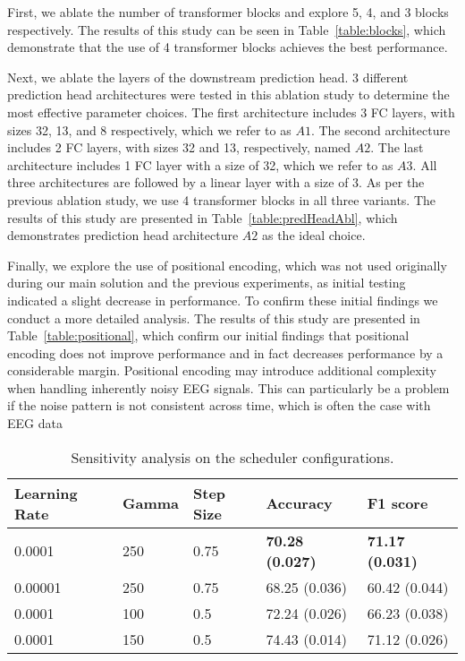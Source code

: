 \documentclass[sigconf]{acmart}
\begin{document}
First, we ablate the number of transformer blocks and explore 5, 4, and 3 blocks respectively. The results of this study can be seen in Table~\ref{table:blocks}, which demonstrate that the use of 4 transformer blocks achieves the best performance. 

Next, we ablate the layers of the downstream prediction head. 3 different prediction head architectures were tested in this ablation study to determine the most effective parameter choices. The first architecture includes 3 FC layers, with sizes 32, 13, and 8 respectively, which we refer to as $A1$. The second architecture includes 2 FC layers, with sizes 32 and 13, respectively, named $A2$. The last architecture includes 1 FC layer with a size of 32, which we refer to as $A3$. All three architectures are followed by a linear layer with a size of 3. As per the previous ablation study, we use 4 transformer blocks in all three variants. The results of this study are presented in Table~\ref{table:predHeadAbl}, which demonstrates prediction head architecture $A2$ as the ideal choice. 

Finally, we explore the use of positional encoding, which was not used originally during our main solution and the previous experiments, as initial testing indicated a slight decrease in performance. To confirm these initial findings we conduct a more detailed analysis. The results of this study are presented in Table~\ref{table:positional}, which confirm our initial findings that positional encoding does not improve performance and in fact decreases performance by a considerable margin. Positional encoding may introduce additional complexity when handling inherently noisy EEG signals. This can particularly be a problem if the noise pattern is not consistent across time, which is often the case with EEG data


  \begin{table}[t]
        \caption{Sensitivity analysis on the scheduler configurations.}
        \label{table:LRS} 
        \small
        \setlength
        \tabcolsep{2pt}
        \begin{center}{
                \begin{tabular}{lllll}
                 \hline
                 Learning Rate & Gamma & Step Size & Accuracy & F1 score \\
                 \hline\hline
                  0.0001 & 250 & 0.75 & \textbf{70.28 (0.027)} & \textbf{71.17 (0.031)}  \\
                  0.00001 & 250 & 0.75 & 68.25 (0.036) & 60.42 (0.044)  \\
                  0.0001 & 100 & 0.5 & 72.24 (0.026) & 66.23 (0.038)  \\
                  0.0001 & 150 & 0.5 & 74.43 (0.014) & 71.12 (0.026) \\
                 \hline
                \end{tabular} 
                }
        \end{center}
\end{table}
\end{document}

